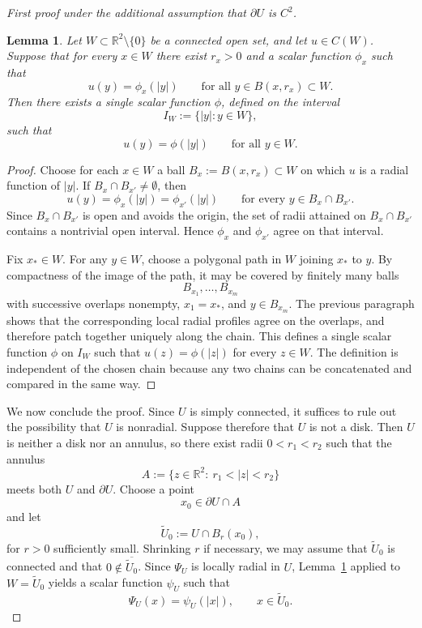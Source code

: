 \documentclass[a4paper,11pt,reqno]{amsart}
\numberwithin{equation}{section}
\theoremstyle{plain} %
\newtheorem{lemma}{Lemma}[section]
\theoremstyle{definition} %
\theoremstyle{remark}
\newcommand{\R}{\mathbb{R}}
\begin{document}
\begin{proof}[First proof under the additional assumption that \(\partial U\) is \(C^2\)]
\begin{lemma}\label{lem:local-to-global-radial}
Let \(W\subset \R^2\setminus\{0\}\) be a connected open set, and let
\(u\in C(W)\). Suppose that for every \(x\in W\) there exist \(r_x>0\) and a
scalar function \(\phi_x\) such that
\[
u(y)=\phi_x(|y|)
\qquad\text{for all } y\in B(x,r_x)\subset W.
\]
Then there exists a single scalar function \(\phi\), defined on the interval
\[
I_W:=\{|y|:y\in W\},
\]
such that
\[
u(y)=\phi(|y|)
\qquad\text{for all } y\in W.
\]
\end{lemma}

\begin{proof}
Choose for each \(x\in W\) a ball \(B_x:=B(x,r_x)\subset W\) on which \(u\) is a
radial function of \(|y|\). If \(B_x\cap B_{x'}\neq\emptyset\), then
\[
u(y)=\phi_x(|y|)=\phi_{x'}(|y|)
\qquad\text{for every }y\in B_x\cap B_{x'}.
\]
Since \(B_x\cap B_{x'}\) is open and avoids the origin, the set of radii attained
on \(B_x\cap B_{x'}\) contains a nontrivial open interval. Hence \(\phi_x\) and
\(\phi_{x'}\) agree on that interval.

Fix \(x_*\in W\). For any \(y\in W\), choose a polygonal path in \(W\) joining
\(x_*\) to \(y\). By compactness of the image of the path, it may be covered by
finitely many balls
\[
B_{x_1},\dots,B_{x_m}
\]
with successive overlaps nonempty, \(x_1=x_*\), and \(y\in B_{x_m}\). The previous
paragraph shows that the corresponding local radial profiles agree on the
overlaps, and therefore patch together uniquely along the chain. This defines a
single scalar function \(\phi\) on \(I_W\) such that \(u(z)=\phi(|z|)\) for every
\(z\in W\). The definition is independent of the chosen chain because any two
chains can be concatenated and compared in the same way.
\end{proof}

We now conclude the proof. Since \(U\) is simply connected, it suffices to rule
out the possibility that \(U\) is nonradial. Suppose therefore that \(U\) is not
a disk. Then \(U\) is neither a disk nor an annulus, so there exist radii
$0<r_1<r_2$ such that the annulus
\[
A:=\{z\in \R^2:\ r_1<|z|<r_2\}
\]
meets both $U$ and $\partial U$. Choose a point
\[
x_0\in \partial U\cap A
\]
and let
\[
\widetilde{U}_0:=U\cap B_r(x_0),
\]
for $r>0$ sufficiently small. Shrinking \(r\) if necessary, we may assume that
\(\widetilde U_0\) is connected and that \(0\notin \overline{\widetilde U_0}\).
Since \(\Psi_U\) is locally radial in \(U\), Lemma~\ref{lem:local-to-global-radial}
applied to \(W=\widetilde U_0\) yields a scalar function \(\psi_U\) such that
\[
\Psi_U(x)=\psi_U(|x|),\qquad x\in \widetilde{U}_0.
\]


\end{proof}
\end{document}
